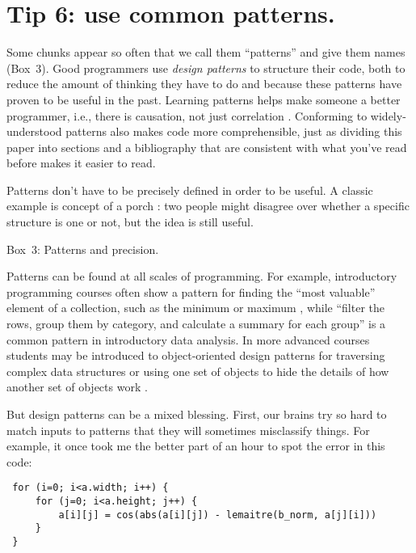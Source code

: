 \documentclass[10pt,letterpaper]{article}
\begin{document}
\section*{Tip 6: use common patterns.}

Some chunks appear so often that we call them ``patterns'' and give them names \colorbox{green!30}{(Box~3)}.
Good programmers use \emph{design patterns} to structure their code,
both to reduce the amount of thinking they have to do
and because these patterns have proven to be useful in the past.
Learning patterns helps make someone a better programmer,
i.e.,
there is causation, not just correlation \cite{Tichy2010}.
Conforming to widely-understood patterns also makes code more comprehensible,
just as dividing this paper into sections and a bibliography
that are consistent with what you've read before
makes it easier to read.

\begin{mdframed}
  \noindent
  Patterns don't have to be precisely defined in order to be useful.
  A classic example is concept of a porch \cite{Brand1995}:
  two people might disagree over whether a specific structure is one or not,
  but the idea is still useful.

  \noindent
  \colorbox{green!30}{Box~3: Patterns and precision.}
\end{mdframed}

Patterns can be found at all scales of programming.
For example,
introductory programming courses often show a pattern for finding the ``most valuable'' element of a collection,
such as the minimum or maximum \cite{Byckling2005},
while ``filter the rows, group them by category, and calculate a summary for each group''
is a common pattern in introductory data analysis.
In more advanced courses students may be introduced to object-oriented design patterns
for traversing complex data structures
or using one set of objects to hide the details of how another set of objects work \cite{Gamma1994,Freeman2020}.

But design patterns can be a mixed blessing.
First,
our brains try so hard to match inputs to patterns that they will sometimes misclassify things.
For example,
it once took me the better part of an hour to spot the error in this code:

\begin{lstlisting}
 for (i=0; i<a.width; i++) {
     for (j=0; i<a.height; j++) {
         a[i][j] = cos(abs(a[i][j]) - lemaitre(b_norm, a[j][i]))
     }
 }
\end{lstlisting}
\end{document}
